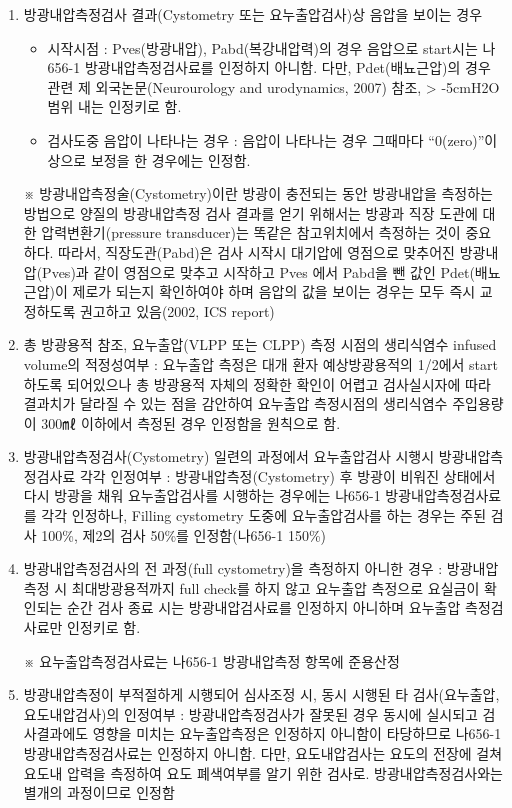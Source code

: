 \begin{enumerate}[①]\tightlist
\item 방광내압측정검사 결과(Cystometry 또는 요누출압검사)상 음압을 보이는 경우
	\begin{itemize}[-]\tightlist
	\item 시작시점 : Pves(방광내압), Pabd(복강내압력)의 경우 음압으로 start시는 나656-1 방광내압측정검사료를 인정하지 아니함. 다만, Pdet(배뇨근압)의 경우 관련 제 외국논문(Neurourology and urodynamics, 2007) 참조, > -5cmH2O 범위 내는 인정키로 함.
	\item 검사도중 음압이 나타나는 경우 : 음압이 나타나는 경우 그때마다 “0(zero)”이상으로 보정을 한 경우에는 인정함.
	\end{itemize}  
	\begin{mdframed}[linecolor=blue,middlelinewidth=2]
	※ 방광내압측정술(Cystometry)이란 방광이 충전되는 동안 방광내압을 측정하는 방법으로 양질의 방광내압측정 검사 결과를 얻기 위해서는 방광과 직장 도관에 대한 압력변환기(pressure transducer)는 똑같은 참고위치에서 측정하는 것이 중요하다. 따라서, 직장도관(Pabd)은 검사 시작시 대기압에 영점으로 맞추어진 방광내압(Pves)과 같이 영점으로 맞추고 시작하고 Pves 에서 Pabd을 뺀 값인 Pdet(배뇨근압)이 제로가 되는지 확인하여야 하며 음압의 값을 보이는 경우는 모두 즉시 교정하도록 권고하고 있음(2002, ICS report)
	\end{mdframed}
\item 총 방광용적 참조, 요누출압(VLPP 또는 CLPP) 측정 시점의 생리식염수 infused volume의 적정성여부
: 요누출압 측정은 대개 환자 예상방광용적의 1/2에서 start 하도록 되어있으나 총 방광용적 자체의 정확한 확인이 어렵고 검사실시자에 따라 결과치가 달라질 수 있는 점을 감안하여 요누출압 측정시점의 생리식염수 주입용량이 300㎖ 이하에서 측정된 경우 인정함을 원칙으로 함.
  
\item 방광내압측정검사(Cystometry) 일련의 과정에서 요누출압검사 시행시 방광내압측정검사료 각각 인정여부
: 방광내압측정(Cystometry) 후 방광이 비워진 상태에서 다시 방광을 채워 요누출압검사를 시행하는 경우에는 나656-1 방광내압측정검사료를 각각 인정하나, Filling cystometry 도중에 요누출압검사를 하는 경우는 주된 검사 100\%, 제2의 검사 50\%를 인정함(나656-1 150\%)
  
\item 방광내압측정검사의 전 과정(full cystometry)을 측정하지 아니한 경우
: 방광내압측정 시 최대방광용적까지 full check를 하지 않고 요누출압 측정으로 요실금이 확인되는 순간 검사 종료 시는 방광내압검사료를 인정하지 아니하며 요누출압 측정검사료만 인정키로 함.
\begin{mdframed}[linecolor=blue,middlelinewidth=2]
※ 요누출압측정검사료는 나656-1 방광내압측정 항목에 준용산정
\end{mdframed}
\item 방광내압측정이 부적절하게 시행되어 심사조정 시, 동시 시행된 타 검사(요누출압, 요도내압검사)의 인정여부
: 방광내압측정검사가 잘못된 경우 동시에 실시되고 검사결과에도 영향을 미치는 요누출압측정은 인정하지 아니함이 타당하므로 나656-1 방광내압측정검사료는 인정하지 아니함.
다만, 요도내압검사는 요도의 전장에 걸쳐 요도내 압력을 측정하여 요도 폐색여부를 알기 위한 검사로. 방광내압측정검사와는 별개의 과정이므로 인정함
  

\end{enumerate}
